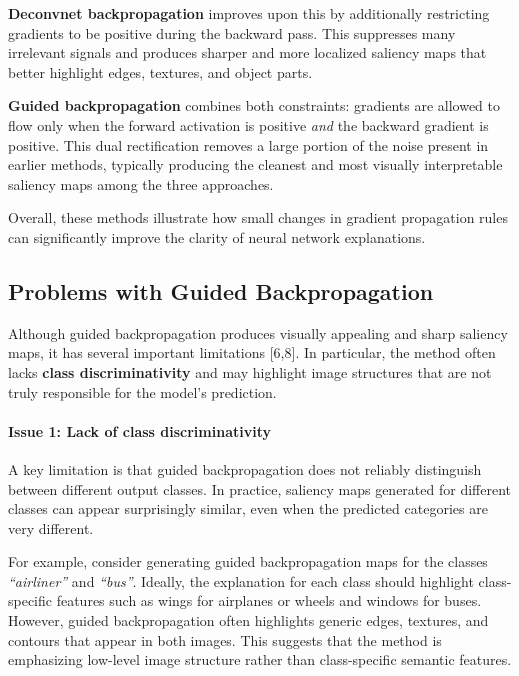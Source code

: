 \documentclass{article}
\renewcommand{\cite}[1]{[#1]}
\begin{document}
\textbf{Deconvnet backpropagation} improves upon this by additionally restricting gradients to be positive during the backward pass. This suppresses many irrelevant signals and produces sharper and more localized saliency maps that better highlight edges, textures, and object parts.

\textbf{Guided backpropagation} combines both constraints: gradients are allowed to flow only when the forward activation is positive \emph{and} the backward gradient is positive. This dual rectification removes a large portion of the noise present in earlier methods, typically producing the cleanest and most visually interpretable saliency maps among the three approaches.

Overall, these methods illustrate how small changes in gradient propagation rules can significantly improve the clarity of neural network explanations.

\subsection{Problems with Guided Backpropagation}

Although guided backpropagation produces visually appealing and sharp saliency maps, it has several important limitations \cite{6,8}. In particular, the method often lacks \textbf{class discriminativity} and may highlight image structures that are not truly responsible for the model’s prediction.

\paragraph{Issue 1: Lack of class discriminativity}

A key limitation is that guided backpropagation does not reliably distinguish between different output classes. In practice, saliency maps generated for different classes can appear surprisingly similar, even when the predicted categories are very different.

For example, consider generating guided backpropagation maps for the classes \emph{``airliner''} and \emph{``bus''}. Ideally, the explanation for each class should highlight class-specific features such as wings for airplanes or wheels and windows for buses. However, guided backpropagation often highlights generic edges, textures, and contours that appear in both images. This suggests that the method is emphasizing low-level image structure rather than class-specific semantic features.
\end{document}
